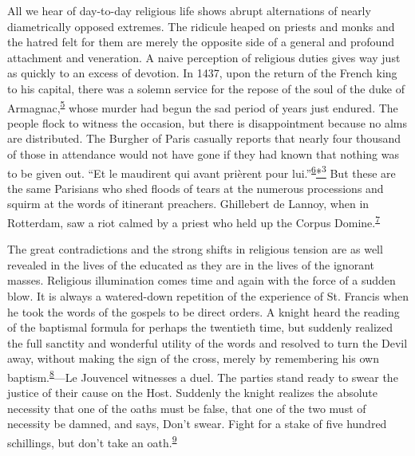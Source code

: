 All we hear of day-to-day religious life shows abrupt alternations of
nearly diametrically opposed extremes. The ridicule heaped on priests
and monks and the hatred felt for them are merely the opposite side of a
general and profound attachment and veneration. A naive perception of
religious duties gives way just as quickly to an excess of devotion. In
1437, upon the return of the French king to his capital, there was a
solemn service for the repose of the soul of the duke of
Armagnac,\textsuperscript{\protect\hypertarget{14_Chapter_Seven__THE_PIOUS_PERSONA.xhtmlux5cux23id_1013}{\protect\hyperlink{23_NOTES.xhtmlux5cux23id_1014}{5}}}
whose murder had begun the sad period of years just endured. The people
flock to witness the occasion, but there is disappointment because no
alms are distributed. The Burgher of Paris casually reports that nearly
four thousand of those in attendance would not have gone if they had
known that nothing was to be given out. ``Et le maudirent qui avant
prièrent pour
lui.''\textsuperscript{\protect\hypertarget{14_Chapter_Seven__THE_PIOUS_PERSONA.xhtmlux5cux23id_1011}{\protect\hyperlink{23_NOTES.xhtmlux5cux23id_1012}{6}}}\protect\hypertarget{14_Chapter_Seven__THE_PIOUS_PERSONA.xhtmlux5cux23id_2545}{\protect\hyperlink{23_NOTES.xhtmlux5cux23id_2546}{*\textsuperscript{3}}}
But these are the same Parisians who shed floods of tears at the
numerous processions and squirm at the words of itinerant preachers.
Ghillebert de Lannoy, when in Rotterdam, saw a riot calmed by a priest
who held up the Corpus
Domine.\textsuperscript{\protect\hypertarget{14_Chapter_Seven__THE_PIOUS_PERSONA.xhtmlux5cux23id_1009}{\protect\hyperlink{23_NOTES.xhtmlux5cux23id_1010}{7}}}

The great contradictions and the strong shifts in religious tension are
as well revealed in the lives of the educated as they are in the lives
of the ignorant masses. Religious illumination comes time and
\protect\hypertarget{14_Chapter_Seven__THE_PIOUS_PERSONA.xhtmlux5cux23page_206}{}{}again
with the force of a sudden blow. It is always a watered-down repetition
of the experience of St. Francis when he took the words of the gospels
to be direct orders. A knight heard the reading of the baptismal formula
for perhaps the twentieth time, but suddenly realized the full sanctity
and wonderful utility of the words and resolved to turn the Devil away,
without making the sign of the cross, merely by remembering his own
baptism.\textsuperscript{\protect\hypertarget{14_Chapter_Seven__THE_PIOUS_PERSONA.xhtmlux5cux23id_1007}{\protect\hyperlink{23_NOTES.xhtmlux5cux23id_1008}{8}}}---Le
Jouvencel witnesses a duel. The parties stand ready to swear the justice
of their cause on the Host. Suddenly the knight realizes the absolute
necessity that one of the oaths must be false, that one of the two must
of necessity be damned, and says, Don't swear. Fight for a stake of five
hundred schillings, but don't take an
oath.\textsuperscript{\protect\hypertarget{14_Chapter_Seven__THE_PIOUS_PERSONA.xhtmlux5cux23id_1005}{\protect\hyperlink{23_NOTES.xhtmlux5cux23id_1006}{9}}}

